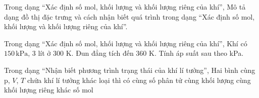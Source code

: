 \begin{ex}
Trong dạng “Xác định số mol, khối lượng và khối lượng riêng của khí”, Mô tả dạng đồ thị đặc trưng và cách nhận biết quá trình trong dạng “Xác định số mol, khối lượng và khối lượng riêng của khí”.
\choiceTF

\end{ex}

\begin{ex}
Trong dạng “Xác định số mol, khối lượng và khối lượng riêng của khí”, Khí có $150\,\text{kPa}$, 3 lít ở 300 K. Đun đẳng tích đến 360 K. Tính áp suất sau theo kPa.
\end{ex}

\begin{ex}
Trong dạng “Nhận biết phương trình trạng thái của khí lí tưởng”, Hai bình cùng p, $V$, $T$ chứa khí lí tưởng khác loại thì có
\choice
{\True cùng số phân tử}
{cùng khối lượng}
{cùng khối lượng riêng}
{khác số mol}
\end{ex}

